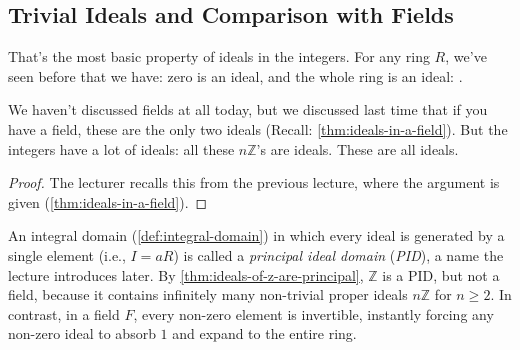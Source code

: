 \subsection{Trivial Ideals and Comparison with Fields}

\begin{speech}[00:56:31 - 00:57:05]
That's the most basic property of ideals in the integers. For any ring $R$, we've seen before that we have: zero is an ideal, and the whole ring is an ideal: .

We haven't discussed fields at all today, but we discussed last time that if you have a field, these are the only two ideals (Recall: \cref{thm:ideals-in-a-field}). But the integers have a lot of ideals: all these $n\mathbb{Z}$'s are ideals. These are all ideals.
\end{speech}

\begin{content}



\begin{proof}
The lecturer recalls this from the previous lecture, where the argument is given (\cref{thm:ideals-in-a-field}).
\end{proof}
\end{content}

\begin{aiNote}
An integral domain (\cref{def:integral-domain}) in which every ideal is generated by a single element (i.e., $I = aR$) is called a \emph{principal ideal domain} (\emph{PID}), a name the lecture introduces later. By \cref{thm:ideals-of-z-are-principal}, $\mathbb{Z}$ is a PID, but not a field, because it contains infinitely many non-trivial proper ideals $n\mathbb{Z}$ for $n \ge 2$. In contrast, in a field $F$, every non-zero element is invertible, instantly forcing any non-zero ideal to absorb $1$ and expand to the entire ring.
\end{aiNote}

